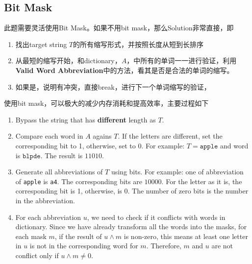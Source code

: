 \subsection{Bit Mask}
此题需要灵活使用Bit Mask。如果不用bit mask，那么Solution非常直接，即
\begin{enumerate}
\item 找出target string $T$的所有缩写形式，并按照长度从短到长排序
\item 从最短的缩写开始，和dictionary，$A$，中所有的单词一一进行验证，利用\textbf{Valid Word Abbreviation}中的方法，看其是否是合法的单词的缩写。
\item 如果是，说明有冲突，直接break，进行下一个单词缩写的验证，
\end{enumerate}

使用bit mask，可以极大的减少内存消耗和提高效率，主要过程如下
\begin{enumerate}
\item Bypass the string that has \textbf{different} length as $T$.
\item Compare each word in $A$ agains $T$. If the letters are different, set the corresponding bit to 1, otherwise, set to 0. For example: $T=\texttt{apple}$ and word is $\texttt{blpde}$. The result is $11010$.
\item Generate all abbreviations of $T$ using bits. For example: one of abbreviation of \texttt{apple} is \texttt{a4}. The corresponding bits are $10000$. For the letter as it is, the corresponding bit is 1, otherwise, is 0. The number of zero bits is the number in the abbreviation. 
\item For each abbreviation $u$, we need to check if it conflicts with words in dictionary. Since we have already transform all the words into the masks, for each mask $m$, if the result of $u\land m$ is non-zero, this means at least one letter in $u$ is not in the corresponding word for $m$. Therefore, $m$ and $u$ are not conflict only if $u\land m \neq 0$. 
\end{enumerate}

